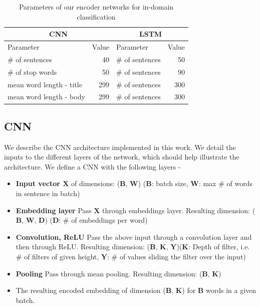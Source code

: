 \documentclass{sigkddExp}
\begin{document}
\begin{table}[h]
\begin{tabular}{l|r|l|r}
      \multicolumn{2}{c|}{CNN}
     & \multicolumn{2}{c}{LSTM}
     \\
     \toprule
     Parameter
     & Value
     & Parameter
     & Value
     \\
     \# of sentences
     & 40
     & \# of sentences
     & 50
     \\
     \# of stop words 
     & 50
     & \# of sentences
     & 90
     \\
     mean word length - title
     & 299
     & \# of sentences
     & 300
     \\
     mean word length - body
     & 299
     & \# of sentences
     & 300
\end{tabular}
\caption{Parameters of our encoder networks for in-domain classification}
\label{tab:indomain}
\end{table}

\subsection{CNN}
We describe the CNN architecture implemented in this work. We detail the inputs to the different layers of the network, which should help illustrate the architecture.
We define a CNN with the following layers -
\begin{itemize}[topsep=0pt,itemsep=-1ex,partopsep=1ex,parsep=1ex]
\item \textbf{Input vector $\mathbf{X}$} of dimensions: ($\mathbf{B}$, $\mathbf{W}$) ($\mathbf{B}$: batch size, $\mathbf{W}$: max \# of words in sentence in batch)
\item \textbf{Embedding layer} Pass $\mathbf{X}$ through embeddings layer. Resulting dimension: ($\mathbf{B}$, $\mathbf{W}$, $\mathbf{D}$) ($\mathbf{D}$: \# of embeddings per word)
\item \textbf{Convolution, ReLU} Pass the above input through a convolution layer and then through ReLU. Resulting dimension: ($\mathbf{B}$, $\mathbf{K}$, $\mathbf{Y}$)($\mathbf{K}$: Depth of filter, i.e. \# of filters of given height, $\mathbf{Y}$: \# of values sliding the filter over the input)
\item \textbf{Pooling} Pass through mean pooling. Resulting dimension: ($\mathbf{B}$, $\mathbf{K}$)
\item The resulting encoded embedding of dimension ($\mathbf{B}$, $\mathbf{K}$) for $\mathbf{B}$ words in a given batch.
\end{itemize}
\end{document}
